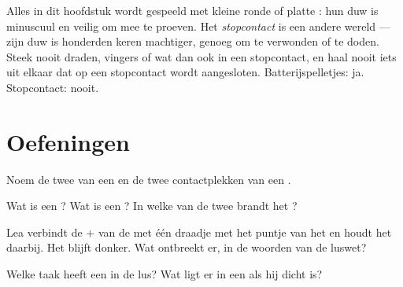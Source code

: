 \begin{remark}\label{rem:g3:first-electric-circuit:safety}
Alles in dit hoofdstuk wordt gespeeld met kleine ronde of platte
: hun duw is minuscuul en veilig om mee te proeven. Het
\emph{stopcontact} is een andere wereld --- zijn duw is honderden
keren machtiger, genoeg om te verwonden of te doden. Steek nooit
draden, vingers of wat dan ook in een stopcontact, en haal nooit iets
uit elkaar dat op een stopcontact wordt aangesloten.
Batterijspelletjes: ja. Stopcontact: nooit.
\end{remark}

\section{Oefeningen}

\begin{exercise}[$\star$]\label{exo:g3:first-electric-circuit:1}
Noem de twee  van een  en de twee contactplekken van een
.
\end{exercise}

\begin{exercise}[$\star$]\label{exo:g3:first-electric-circuit:2}
Wat is een ? Wat is een ? In
welke van de twee brandt het ?
\end{exercise}

\begin{exercise}[$\star$]\label{exo:g3:first-electric-circuit:3}
Lea verbindt de $+$ van de  met één draadje met het
puntje van het  en houdt het daarbij. Het  blijft donker.
Wat ontbreekt er, in de woorden van de luswet?
\end{exercise}

\begin{exercise}[$\star$]\label{exo:g3:first-electric-circuit:4}
Welke taak heeft een  in de lus? Wat ligt er in een
 als hij dicht is?
\end{exercise}

